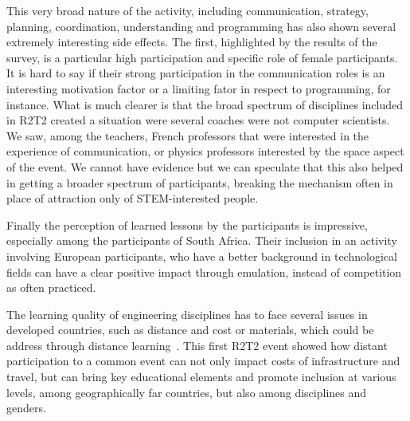 \documentclass{intech-journal}
\begin{document}

This very broad nature of the activity, including communication, strategy, planning, coordination, understanding and programming has also shown several extremely interesting side effects.
The first, highlighted by the results of the survey, is a particular high participation and specific role of female participants.
It is hard to say if their strong participation in the communication roles is an interesting motivation factor or a limiting fator in respect to programming, for instance. 
What is much clearer is that the broad spectrum of disciplines included in R2T2 created a situation were several coaches were not computer scientists. 
We saw, among the teachers, French professors that were interested in the experience of communication, or physics professors interested by the space aspect of the event. 
We cannot have evidence but we can speculate that this also helped in getting a broader spectrum of participants, breaking the mechanism often in place of attraction only of STEM-interested people.

Finally the perception of learned lessons by the participants is impressive, especially among the participants of South Africa.
Their inclusion in an activity involving European participants, who have a better background in technological fields can have a clear positive impact through emulation, instead of competition as often practiced. 

The learning quality of engineering disciplines has to face several issues in developed countries, such as distance and cost or materials, which could be address through distance learning~\cite{winthrop2012new}. 
This first R2T2 event showed how distant participation to a common event can not only impact costs of infrastructure and travel, but can bring key educational elements and promote inclusion at various levels, among geographically far countries, but also among disciplines and genders.

{}
\end{document}
